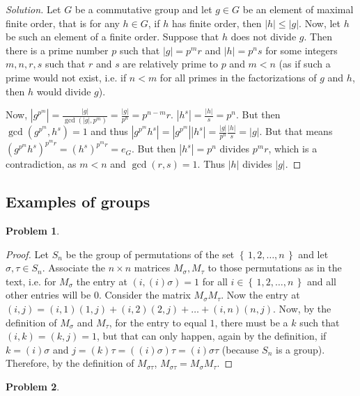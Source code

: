 \documentclass{article}
\theoremstyle{definition}
\newtheorem{problem-internal}{Problem}[subsection]
\newenvironment{problem}{
	\medskip
	\begin{problem-internal}
	}{
\end{problem-internal}
}
\newenvironment{solution}{
	\begin{proof}[Solution]
		\vspace{-8px}
		\setlength{\parskip}{4px}
		\setlength{\parindent}{0px}
	}{
\end{proof}
}
\newcommand{\set}[1]{\left\{\,#1\,\right\}}
\newcommand{\abs}[1]{\left|#1\right|}
\begin{document}
\begin{solution}
	Let $G$ be a commutative group and let $g \in G$ be an element of maximal finite order, that is for any $h \in G$, if $h$ has finite order, then $\abs{h} \leq \abs{g}$. Now, let $h$ be such an element of a finite order. Suppose that $h$ does not divide $g$. Then there is a prime number $p$ such that $\abs{g}=p^m r$ and $\abs{h}=p^n s$ for some integers $m, n, r, s$ such that $r$ and $s$ are relatively prime to $p$ and $m < n$ (as if such a prime would not exist, i.e. if $n < m$ for all primes in the factorizations of $g$ and $h$, then $h$ would divide $g$). 
	
	Now, $\abs{g^{p^m}}=\frac{\abs{g}}{\gcd(\abs{g},p^m)}=\frac{\abs{g}}{p^n}=p^{n-m}r$. $\abs{h^s}=\frac{\abs{h}}{s}=p^n$. But then $\gcd(g^{p^m},h^s)=1$ and thus $\abs{g^{p^m}h^s}=\abs{g^{p^m}}\abs{h^s}=\frac{\abs{g}}{p^n}\frac{\abs{h}}{s}=\abs{g}$. But that means $(g^{p^m}h^s)^{p^m r}=(h^s)^{p^m r}=e_G$. But then $\abs{h^s}=p^n$ divides $p^m r$, which is a contradiction, as $m < n$ and $\gcd(r,s)=1$. Thus $\abs{h}$ divides $\abs{g}$.
\end{solution}

\subsection{Examples of groups}

\begin{problem}
\end{problem}

\begin{proof}
	Let $S_n$ be the group of permutations of the set $\set{1,2,\dots,n}$ and let $\sigma,\tau \in S_n$. Associate the $n \times n$ matrices $M_\sigma, M_\tau$ to those permutations as in the text, i.e. for $M_\sigma$ the entry at $(i, (i)\sigma)=1$ for all $i \in \set{1,2,\dots,n}$ and all other entries will be $0$. Consider the matrix $M_\sigma M_\tau$. Now the entry at $(i,j)=(i,1)(1,j)+(i,2)(2,j)+\dots+(i,n)(n,j)$. Now, by the definition of $M_\sigma$ and $M_\tau$, for the entry to equal $1$, there must be a $k$ such that $(i,k)=(k,j)=1$, but that can only happen, again by the definition, if $k = (i)\sigma$ and $j = (k)\tau=((i)\sigma)\tau=(i)\sigma\tau$ (because $S_n$ is a group). Therefore, by the definition of $M_{\sigma\tau}$, $M_{\sigma\tau}=M_\sigma M_\tau$.
\end{proof}

\begin{problem}
\end{problem}
\end{document}

